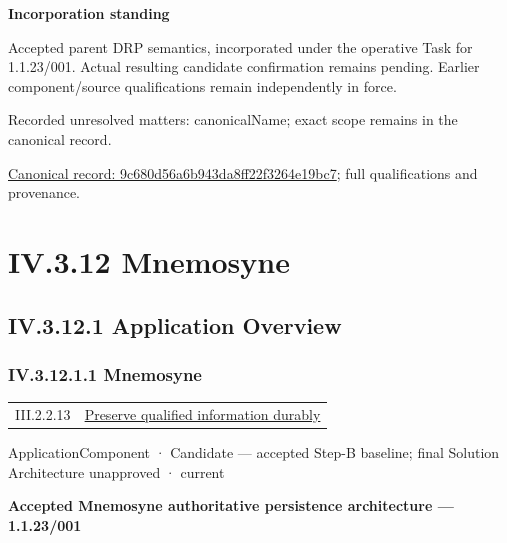 \par\medskip\textbf{Incorporation standing}\par


Accepted parent DRP semantics, incorporated under the operative Task for 1.1.23/001. Actual resulting candidate confirmation remains pending. Earlier component/source qualifications remain independently in force.


{\small Recorded unresolved matters: canonicalName; exact scope remains in the canonical record.}\par
{\footnotesize \href{../../../../continuum/application/application-function/9c680d56a6b943da8ff22f3264e19bc7.md}{Canonical record: 9c680d56a6b943da8ff22f3264e19bc7}; full qualifications and provenance.}\par
\section*{IV.3.12 Mnemosyne}
\label{navigation:IV.3.12}

\subsection*{IV.3.12.1 Application Overview}
\label{navigation:IV.3.12.1}

\subsubsection*{IV.3.12.1.1 Mnemosyne}
\label{navigation:IV.3.12.1.1}

\begin{longtable}{p{.22\linewidth}p{.73\linewidth}}
III.2.2.13 & \hyperref[element:e07ef0bcd9444af3a22ab45bbb3afc38]{Preserve qualified information durably} \\
\end{longtable}
\label{element:7985e647bf9e4ca3ba70faf9e3e4ae02}
{\small ApplicationComponent · Candidate — accepted Step-B baseline; final Solution Architecture unapproved · current}\par

\par\medskip\textbf{Accepted Mnemosyne authoritative persistence architecture — 1.1.23/001}\par


